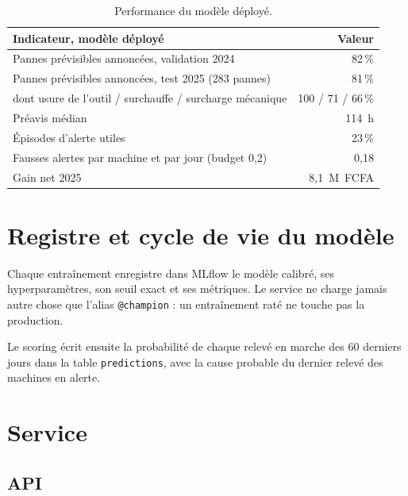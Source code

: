 \documentclass[11pt,a4paper]{article}
\newcommand{\recallval}{82\,\%}
\newcommand{\recalltest}{81\,\%}
\newcommand{\pannestest}{283}
\newcommand{\preavis}{114~h}
\newcommand{\utiles}{23\,\%}
\newcommand{\fa}{0,18}
\newcommand{\gainnet}{8,1~M~FCFA}
\newcommand{\entete}{}
\newcommand{\var}[1]{\texttt{#1}}
\begin{document}
\begin{table}[H]
\centering\small
\begin{tabular}{@{}L{9.5cm}r@{}}
\toprule
\entete \textbf{Indicateur, modèle déployé} & \textbf{Valeur} \\
\midrule
Pannes prévisibles annoncées, validation 2024 & \recallval \\
Pannes prévisibles annoncées, test 2025 (\pannestest{} pannes) & \recalltest \\
\quad dont usure de l'outil / surchauffe / surcharge mécanique & 100 / 71 / 66\,\% \\
Préavis médian & \preavis \\
Épisodes d'alerte utiles & \utiles \\
Fausses alertes par machine et par jour (budget 0,2) & \fa \\
Gain net 2025 & \gainnet \\
\bottomrule
\end{tabular}
\caption{Performance du modèle déployé.}
\end{table}

\section{Registre et cycle de vie du modèle}

Chaque entraînement enregistre dans MLflow le modèle calibré, ses hyperparamètres, son seuil exact et ses métriques.
Le service ne charge jamais autre chose que l'alias \var{@champion} : un entraînement raté ne touche pas la
production.


Le scoring écrit ensuite la probabilité de chaque relevé en marche des 60 derniers jours dans la table
\var{predictions}, avec la cause probable du dernier relevé des machines en alerte.

\section{Service}

\subsection{API}
\end{document}
